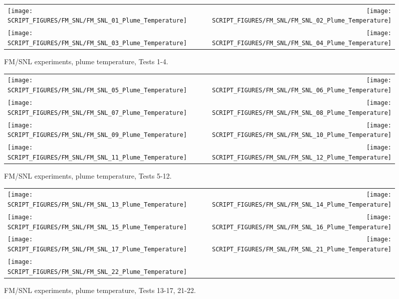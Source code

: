 \begin{figure}[!h]
\begin{tabular*}{\textwidth}{l@{\extracolsep{\fill}}r}
\texttt{[image: SCRIPT\_FIGURES/FM\_SNL/FM\_SNL\_01\_Plume\_Temperature]} &
\texttt{[image: SCRIPT\_FIGURES/FM\_SNL/FM\_SNL\_02\_Plume\_Temperature]} \\
\texttt{[image: SCRIPT\_FIGURES/FM\_SNL/FM\_SNL\_03\_Plume\_Temperature]} &
\texttt{[image: SCRIPT\_FIGURES/FM\_SNL/FM\_SNL\_04\_Plume\_Temperature]}
\end{tabular*}
\caption[FM/SNL experiments, plume temperature, Tests 1-4]
{FM/SNL experiments, plume temperature, Tests 1-4.}
\label{FM_SNL_Plume_1}
\end{figure}

\newpage

\begin{figure}[p]
\begin{tabular*}{\textwidth}{l@{\extracolsep{\fill}}r}
\texttt{[image: SCRIPT\_FIGURES/FM\_SNL/FM\_SNL\_05\_Plume\_Temperature]} &
\texttt{[image: SCRIPT\_FIGURES/FM\_SNL/FM\_SNL\_06\_Plume\_Temperature]} \\
\texttt{[image: SCRIPT\_FIGURES/FM\_SNL/FM\_SNL\_07\_Plume\_Temperature]} &
\texttt{[image: SCRIPT\_FIGURES/FM\_SNL/FM\_SNL\_08\_Plume\_Temperature]} \\
\texttt{[image: SCRIPT\_FIGURES/FM\_SNL/FM\_SNL\_09\_Plume\_Temperature]} &
\texttt{[image: SCRIPT\_FIGURES/FM\_SNL/FM\_SNL\_10\_Plume\_Temperature]} \\
\texttt{[image: SCRIPT\_FIGURES/FM\_SNL/FM\_SNL\_11\_Plume\_Temperature]} &
\texttt{[image: SCRIPT\_FIGURES/FM\_SNL/FM\_SNL\_12\_Plume\_Temperature]}
\end{tabular*}
\caption[FM/SNL experiments, plume temperature, Tests 5-12]
{FM/SNL experiments, plume temperature, Tests 5-12.}
\label{FM_SNL_Plume_2}
\end{figure}

\begin{figure}[p]
\begin{tabular*}{\textwidth}{l@{\extracolsep{\fill}}r}
\texttt{[image: SCRIPT\_FIGURES/FM\_SNL/FM\_SNL\_13\_Plume\_Temperature]} &
\texttt{[image: SCRIPT\_FIGURES/FM\_SNL/FM\_SNL\_14\_Plume\_Temperature]} \\
\texttt{[image: SCRIPT\_FIGURES/FM\_SNL/FM\_SNL\_15\_Plume\_Temperature]} &
\texttt{[image: SCRIPT\_FIGURES/FM\_SNL/FM\_SNL\_16\_Plume\_Temperature]} \\
\texttt{[image: SCRIPT\_FIGURES/FM\_SNL/FM\_SNL\_17\_Plume\_Temperature]} &
\texttt{[image: SCRIPT\_FIGURES/FM\_SNL/FM\_SNL\_21\_Plume\_Temperature]} \\
\texttt{[image: SCRIPT\_FIGURES/FM\_SNL/FM\_SNL\_22\_Plume\_Temperature]} &
\end{tabular*}
\caption[FM/SNL experiments, plume temperature, Tests 13-17, 21-22]
{FM/SNL experiments, plume temperature, Tests 13-17, 21-22.}
\label{FM_SNL_Plume_3}
\end{figure}

